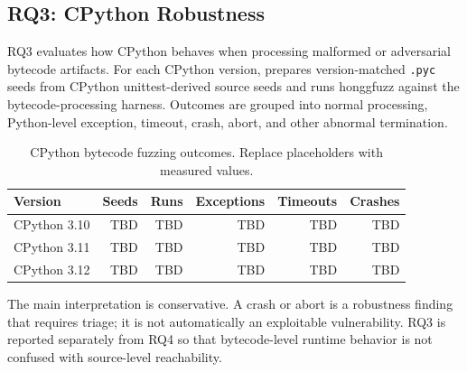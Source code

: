 \subsection{RQ3: CPython Robustness}\label{sec:RQ3}

RQ3 evaluates how CPython behaves when processing malformed or adversarial bytecode artifacts.  For each CPython version, {\tech} prepares version-matched \texttt{.pyc} seeds from CPython unittest-derived source seeds and runs honggfuzz against the bytecode-processing harness.  Outcomes are grouped into normal processing, Python-level exception, timeout, crash, abort, and other abnormal termination.

\begin{table}[t]
  \centering
  \caption{CPython bytecode fuzzing outcomes. Replace placeholders with measured values.}
  \label{tab:runtime-results-rq3}
  \begin{tabular}{lrrrrr}
    \toprule
    Version & Seeds & Runs & Exceptions & Timeouts & Crashes \\
    \midrule
    CPython 3.10 & TBD & TBD & TBD & TBD & TBD \\
    CPython 3.11 & TBD & TBD & TBD & TBD & TBD \\
    CPython 3.12 & TBD & TBD & TBD & TBD & TBD \\
    \bottomrule
  \end{tabular}
\end{table}

The main interpretation is conservative.  A crash or abort is a robustness finding that requires triage; it is not automatically an exploitable vulnerability.  RQ3 is reported separately from RQ4 so that bytecode-level runtime behavior is not confused with source-level reachability.

